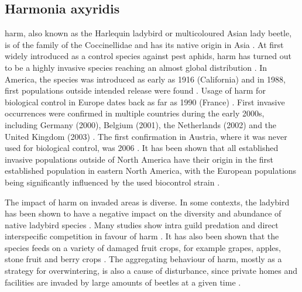 \documentclass[12pt,a4paper]{article}
\begin{document}
\subsection{Harmonia axyridis}
\gls{harm}, also known as the Harlequin ladybird or multicoloured Asian lady beetle, is of the family of the Coccinellidae and has its native origin in Asia \autocite{roy2016harmonia}.
At first widely introduced as a control species against pest aphids, \gls{harm} has turned out to be a highly invasive species reaching an almost global distribution \autocite{brown2008harmonia}.
In America, the species was introduced as early as 1916 (California) and in 1988, first populations outside intended release were found \autocite{chapin1991harmoniaNA}.
Usage of \gls{harm} for biological control in Europe dates back as far as 1990 (France) \autocite{coutanceau2006harmoniaFR}.
First invasive occurrences were confirmed in multiple countries during the early 2000s, including Germany (2000), Belgium (2001), the Netherlands (2002) and the United Kingdom (2003) \autocite{roy2016harmonia}.
The first confirmation in Austria, where it was never used for biological control, was 2006 \autocite{rabitsch2006harmoniaAT}.  
It has been shown that all established invasive populations outside of North America have their origin in the first established population in eastern North America, with the European populations being significantly influenced by the used biocontrol strain \autocite{lombaert2010harmoniabridgehead}.

The impact of \gls{harm} on invaded areas is diverse.
In some contexts, the ladybird has been shown to have a negative impact on the diversity and abundance of native ladybird species \autocite{roy2016harmonia}.
Many studies show intra guild predation and direct interspecific competition in favour of \gls{harm} \autocite{pell2008harmoniaIGP}.
It has also been shown that the species feeds on a variety of damaged fruit crops, for example grapes, apples, stone fruit and berry crops \autocite{koch2004harmoniafoodcrop}.
The aggregating behaviour of \gls{harm}, mostly as a strategy for overwintering, is also a cause of disturbance, since private homes and facilities are invaded by large amounts of beetles at a given time \autocite{nalepa2005harmoniahomes}.

\newpage
\printbibliography[]

\end{document}

